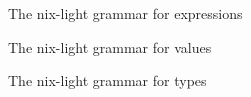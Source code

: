 \begin{figure}
  
  \caption{\label{grammar::expressions}The nix-light grammar for expressions}
\end{figure}

\begin{figure}
  
  \caption{\label{grammar::values}The nix-light grammar for values}
\end{figure}

\begin{figure}
  
  \caption{\label{grammar::types}The nix-light grammar for types}
\end{figure}

